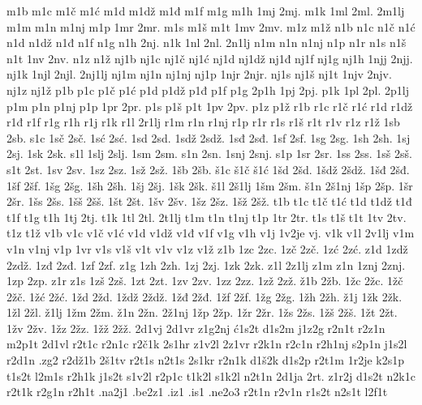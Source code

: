 {m1b
m1c
m1č
m1ć
m1d
m1dž
m1đ
m1f
m1g
m1h
1mj
2mj.
m1k
1ml
2ml.
2m1lj
m1m
m1n
m1nj
m1p
1mr
2mr.
m1s
m1š
m1t
1mv
2mv.
m1z
m1ž
n1b
n1c
n1č
n1ć
n1d
n1dž
n1đ
n1f
n1g
n1h
2nj.
n1k
1nl
2nl.
2n1lj
n1m
n1n
n1nj
n1p
n1r
n1s
n1š
n1t
1nv
2nv.
n1z
n1ž
nj1b
nj1c
nj1č
nj1ć
nj1d
nj1dž
nj1đ
nj1f
nj1g
nj1h
1njj
2njj.
nj1k
1njl
2njl.
2nj1lj
nj1m
nj1n
nj1nj
nj1p
1njr
2njr.
nj1s
nj1š
nj1t
1njv
2njv.
nj1z
nj1ž
p1b
p1c
p1č
p1ć
p1d
p1dž
p1đ
p1f
p1g
2p1h
1pj
2pj.
p1k
1pl
2pl.
2p1lj
p1m
p1n
p1nj
p1p
1pr
2pr.
p1s
p1š
p1t
1pv
2pv.
p1z
p1ž
r1b
r1c
r1č
r1ć
r1d
r1dž
r1đ
r1f
r1g
r1h
r1j
r1k
r1l
2r1lj
r1m
r1n
r1nj
r1p
r1r
r1s
r1š
r1t
r1v
r1z
r1ž
1sb
2sb.
s1c
1sč
2sč.
1sć
2sć.
1sd
2sd.
1sdž
2sdž.
1sđ
2sđ.
1sf
2sf.
1sg
2sg.
1sh
2sh.
1sj
2sj.
1sk
2sk.
s1l
1slj
2slj.
1sm
2sm.
s1n
2sn.
1snj
2snj.
s1p
1sr
2sr.
1ss
2ss.
1sš
2sš.
s1t
2st.
1sv
2sv.
1sz
2sz.
1sž
2sž.
1šb
2šb.
š1c
š1č
š1ć
1šd
2šd.
1šdž
2šdž.
1šđ
2šđ.
1šf
2šf.
1šg
2šg.
1šh
2šh.
1šj
2šj.
1šk
2šk.
š1l
2š1lj
1šm
2šm.
š1n
2š1nj
1šp
2šp.
1šr
2šr.
1šs
2šs.
1šš
2šš.
1št
2št.
1šv
2šv.
1šz
2šz.
1šž
2šž.
t1b
t1c
t1č
t1ć
t1d
t1dž
t1đ
t1f
t1g
t1h
1tj
2tj.
t1k
1tl
2tl.
2t1lj
t1m
t1n
t1nj
t1p
1tr
2tr.
t1s
t1š
t1t
1tv
2tv.
t1z
t1ž
v1b
v1c
v1č
v1ć
v1d
v1dž
v1đ
v1f
v1g
v1h
v1j
1v2je
vj.
v1k
v1l
2v1lj
v1m
v1n
v1nj
v1p
1vr
v1s
v1š
v1t
v1v
v1z
v1ž
z1b
1zc
2zc.
1zč
2zč.
1zć
2zć.
z1d
1zdž
2zdž.
1zđ
2zđ.
1zf
2zf.
z1g
1zh
2zh.
1zj
2zj.
1zk
2zk.
z1l
2z1lj
z1m
z1n
1znj
2znj.
1zp
2zp.
z1r
z1s
1zš
2zš.
1zt
2zt.
1zv
2zv.
1zz
2zz.
1zž
2zž.
ž1b
2žb.
1žc
2žc.
1žč
2žč.
1žć
2žć.
1žd
2žd.
1ždž
2ždž.
1žđ
2žđ.
1žf
2žf.
1žg
2žg.
1žh
2žh.
ž1j
1žk
2žk.
1žl
2žl.
ž1lj
1žm
2žm.
ž1n
2žn.
2ž1nj
1žp
2žp.
1žr
2žr.
1žs
2žs.
1žš
2žš.
1žt
2žt.
1žv
2žv.
1žz
2žz.
1žž
2žž.
2d1vj
2d1vr
z1g2nj
ć1s2t
d1s2m
j1z2g
r2n1t
r2z1n
m2p1t
2d1vl
r2t1c
r2n1c
r2č1k
2s1hr
z1v2l
2z1vr
r2k1n
r2c1n
r2h1nj
s2p1n
j1s2l
r2d1n
.zg2
r2dž1b
2š1tv
r2t1s
n2t1s
2s1kr
r2n1k
d1š2k
d1s2p
r2t1m
1r2je
k2s1p
t1s2t
l2m1s
r2h1k
j1s2t
s1v2l
r2p1c
t1k2l
s1k2l
n2t1n
2d1ja
2rt.
z1r2j
d1s2t
n2k1c
r2t1k
r2g1n
r2h1t
.na2j1
.be2z1
.iz1
.is1
.ne2o3
r2t1n
r2v1n
r1s2t
n2s1t
l2f1t
}
